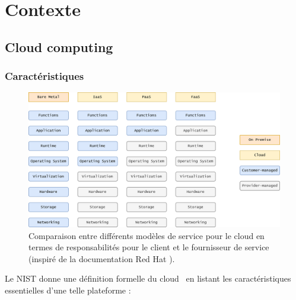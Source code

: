 \clearemptydoublepage
\chapter{Contexte}

\section{Cloud computing}

\subsection{Caractéristiques}

\begin{figure}[htbp]
    \centering
	\includegraphics[width=\textwidth]{3_Chapitre1/figures/service-models.png}
	\caption[Comparaison entre différents modèles de service pour le cloud en termes de responsabilités pour le client et le fournisseur de service.]{Comparaison entre différents modèles de service pour le cloud en termes de responsabilités pour le client et le fournisseur de service (inspiré de la documentation Red Hat \protect \footnotemark).}
	\label{fig:service-model}
\end{figure}


Le NIST donne une définition formelle du cloud~\cite{mellNISTDefinitionCloud} en listant les caractéristiques essentielles d'une telle plateforme :

